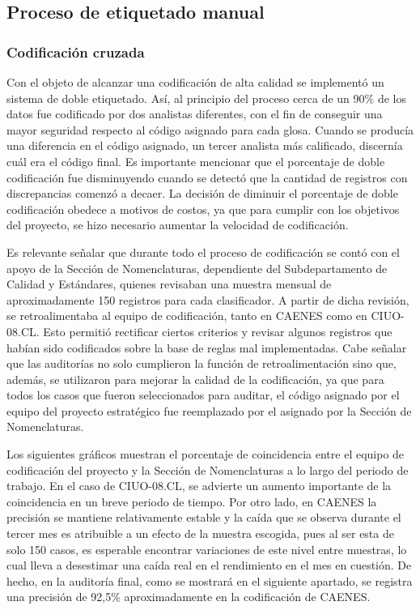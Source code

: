 \documentclass[
  12pt,
  spanish,
]{article}
\begin{document}
\hypertarget{proceso-de-etiquetado-manual}{%
\subsection{Proceso de etiquetado
manual}\label{proceso-de-etiquetado-manual}}

\hypertarget{codificaciuxf3n-cruzada}{%
\subsubsection{Codificación cruzada}\label{codificaciuxf3n-cruzada}}

Con el objeto de alcanzar una codificación de alta calidad se implementó
un sistema de doble etiquetado. Así, al principio del proceso cerca de
un 90\% de los datos fue codificado por dos analistas diferentes, con el
fin de conseguir una mayor seguridad respecto al código asignado para
cada glosa. Cuando se producía una diferencia en el código asignado, un
tercer analista más calificado, discernía cuál era el código final. Es
importante mencionar que el porcentaje de doble codificación fue
disminuyendo cuando se detectó que la cantidad de registros con
discrepancias comenzó a decaer. La decisión de diminuir el porcentaje de
doble codificación obedece a motivos de costos, ya que para cumplir con
los objetivos del proyecto, se hizo necesario aumentar la velocidad de
codificación.

Es relevante señalar que durante todo el proceso de codificación se
contó con el apoyo de la Sección de Nomenclaturas, dependiente del
Subdepartamento de Calidad y Estándares, quienes revisaban una muestra
mensual de aproximadamente 150 registros para cada clasificador. A
partir de dicha revisión, se retroalimentaba al equipo de codificación,
tanto en CAENES como en CIUO-08.CL. Esto permitió rectificar ciertos
criterios y revisar algunos registros que habían sido codificados sobre
la base de reglas mal implementadas. Cabe señalar que las auditorías no
solo cumplieron la función de retroalimentación sino que, además, se
utilizaron para mejorar la calidad de la codificación, ya que para todos
los casos que fueron seleccionados para auditar, el código asignado por
el equipo del proyecto estratégico fue reemplazado por el asignado por
la Sección de Nomenclaturas.

Los siguientes gráficos muestran el porcentaje de coincidencia entre el
equipo de codificación del proyecto y la Sección de Nomenclaturas a lo
largo del periodo de trabajo. En el caso de CIUO-08.CL, se advierte un
aumento importante de la coincidencia en un breve periodo de tiempo. Por
otro lado, en CAENES la precisión se mantiene relativamente estable y la
caída que se observa durante el tercer mes es atribuible a un efecto de
la muestra escogida, pues al ser esta de solo 150 casos, es esperable
encontrar variaciones de este nivel entre muestras, lo cual lleva a
desestimar una caída real en el rendimiento en el mes en cuestión. De
hecho, en la auditoría final, como se mostrará en el siguiente apartado,
se registra una precisión de 92,5\% aproximadamente en la codificación
de CAENES.
\end{document}
